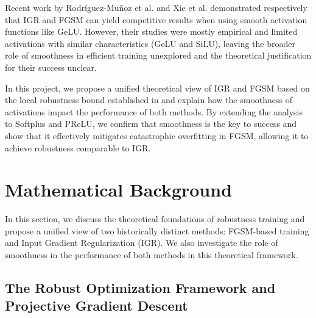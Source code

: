 \documentclass{article}
\begin{document}
Recent work by Rodríguez-Muñoz et al. \cite{rodríguezmuñoz2024characterizingmodelrobustnessnatural} and Xie et al. \cite{xie2021smoothadversarialtraining} demonstrated respectively that IGR and FGSM can yield competitive results when using smooth activation functions like GeLU. However, their studies were mostly empirical and limited activations with similar characteristics (GeLU and SiLU), leaving the broader role of smoothness in efficient training unexplored and the theoretical justification for their success unclear.

In this project, we propose a unified theoretical view of IGR and FGSM based on the local robustness bound established in \cite{finlay2019scaleableinputgradientregularization} and explain how the smoothness of activations impact the performance of both methods. By extending the analysis to Softplus and PReLU, we confirm that smoothness is the key to success and show that it effectively mitigates catastrophic overfitting in FGSM, allowing it to achieve robustness comparable to IGR.

\section{Mathematical Background}

In this section, we discuss the theoretical foundations of robustness training and propose a unified view of two historically distinct methods: FGSM-based training and Input Gradient Regularization (IGR). We also investigate the role of smoothness in the performance of both methods in this theoretical framework.

\subsection{The Robust Optimization Framework and Projective Gradient Descent}
\end{document}

